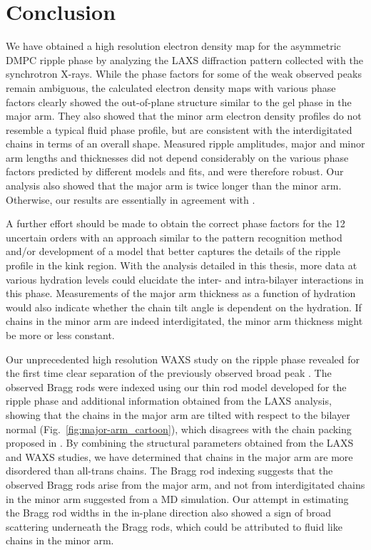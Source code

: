 \section{Conclusion}\label{sec:ripple_conclusion}
We have obtained a high resolution electron density map for the asymmetric
DMPC ripple phase by analyzing the LAXS diffraction pattern collected with
the synchrotron X-rays. 
While the phase factors for some of the weak observed peaks
remain ambiguous, the calculated electron density maps with various phase
factors clearly showed the out-of-plane structure similar to the gel phase
in the major arm. They also showed that the minor arm electron density profiles
do not resemble a typical fluid phase profile, but are consistent with
the interdigitated chains in terms of an overall shape.
Measured ripple amplitudes, major and minor arm lengths and thicknesses
did not depend considerably on the various phase factors predicted by 
different models and fits, and were therefore robust. 
Our analysis also showed that the major arm is twice longer than the minor arm.
Otherwise, our results are essentially in agreement with \cite{ref:Sun96}.

A further effort should be made to obtain the correct phase factors for the 12 uncertain orders
with an approach similar to the pattern recognition method
and/or development of a model that better captures the details of the ripple
profile in the kink region. 
With the analysis detailed in this thesis,
more data at various hydration levels could elucidate the 
inter- and intra-bilayer interactions in this phase.
Measurements of the major arm thickness as a function of hydration
would also indicate whether the chain tilt angle is dependent on the hydration.
If chains in the minor arm are indeed interdigitated, the minor arm thickness
might be more or less constant.

Our unprecedented high resolution WAXS study on the ripple phase 
revealed for the first time
clear separation of the previously observed broad peak \cite{ref:Katsaras95}.
The observed Bragg rods were indexed using our thin rod model developed 
for the ripple phase and additional information obtained from the LAXS
analysis, showing that the chains in the major arm are 
tilted with respect to the bilayer normal (Fig.~\ref{fig:major-arm_cartoon}),
which disagrees with the chain packing proposed in \cite{ref:Sengupta00,ref:Sengupta03}.
By combining the structural parameters obtained from the LAXS and WAXS studies,
we have determined that chains in the major arm are more 
disordered than all-trans chains.
The Bragg rod indexing suggests that the observed Bragg rods arise 
from the major arm, and not from interdigitated chains 
in the minor arm suggested from a MD simulation.
Our attempt in estimating the Bragg rod widths in the in-plane direction
also showed a sign of broad scattering underneath the Bragg rods,
which could be attributed to fluid like chains in the minor arm.

